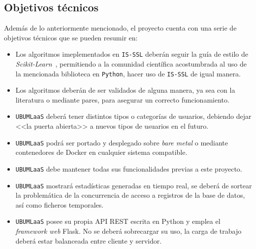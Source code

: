 \subsection{Objetivos técnicos}
Además de lo anteriormente mencionado, el proyecto cuenta con una serie de objetivos técnicos que se pueden resumir en:
\begin{itemize}
\item Los algoritmos imeplementados en \texttt{IS-SSL} deberán seguir la guía de estilo de \textit{Scikit-Learn}~\cite{SKLEARNGUIDELINES}, permitiendo a la comunidad científica acostumbrada al uso de la mencionada biblioteca en \texttt{Python}, hacer uso de \texttt{IS-SSL} de igual manera.
\item Los algoritmos deberán de ser validados de alguna manera, ya sea con la literatura o mediante pares, para asegurar un correcto funcionamiento. 
\item \texttt{UBUMLaaS} deberá tener distintos tipos o categorías de usuarios, debiendo dejar <<la puerta abierta>> a nuevos tipos de usuarios en el futuro.
\item \texttt{UBUMLaaS} podrá ser portado y desplegado sobre  \textit{bare metal} o mediante contenedores de Docker en cualquier sistema compatible.
\item \texttt{UBUMLaaS} debe mantener todas sus funcionalidades previas a este proyecto.
\item \texttt{UBUMLaaS} mostrará estadísticas generadas en tiempo real, se deberá de sortear la problemática de la concurrencia de acceso a registros de la base de datos, así como ficheros temporales.
\item \texttt{UBUMLaaS} posee su propia API REST escrita en Python y emplea el \textit{framework web} Flask. No se deberá sobrecargar su uso, la carga de trabajo deberá estar balanceada entre cliente y servidor.
\end{itemize}